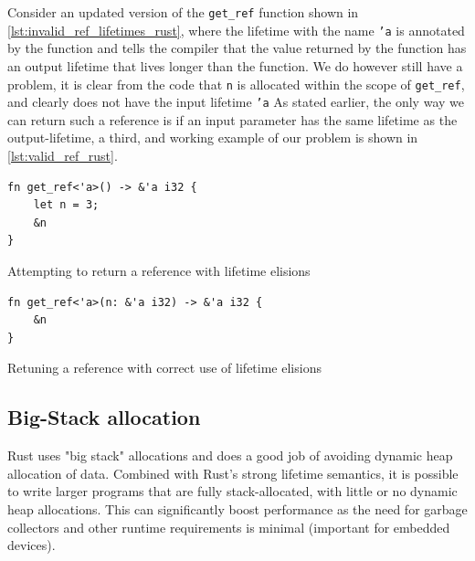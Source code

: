 Consider an updated version of the \texttt{get\_ref} function shown in \autoref{lst:invalid_ref_lifetimes_rust}, where the lifetime with the name \texttt{'a} is annotated by the function and tells the compiler that the value returned by the function has an output lifetime that lives longer than the function.
We do however still have a problem, it is clear from the code that \texttt{n} is allocated within the scope of \texttt{get\_ref}, and clearly does not have the input lifetime \texttt{'a}
As stated earlier, the only way we can return such a reference is if an input parameter has the same lifetime as the output-lifetime, a third, and working example of our problem is shown in \autoref{lst:valid_ref_rust}.


\begin{listing}[tb]
\begin{verbatim}
fn get_ref<'a>() -> &'a i32 {
    let n = 3;
    &n
}
\end{verbatim}
\caption{Attempting to return a reference with lifetime elisions}
\label{lst:invalid_ref_lifetimes_rust}
\end{listing}

\begin{listing}[tb]
\begin{verbatim}
fn get_ref<'a>(n: &'a i32) -> &'a i32 {
    &n
}
\end{verbatim}
\caption{Retuning a reference with correct use of lifetime elisions}
\label{lst:valid_ref_rust}
\end{listing}


\subsection{Big-Stack allocation}
\label{par:big_stack}

Rust uses "big stack" allocations and does a good job of avoiding dynamic heap allocation of data.
Combined with Rust's strong lifetime semantics, it is possible to write larger programs that are fully stack-allocated, with little or no dynamic heap allocations.
This can significantly boost performance as the need for garbage collectors and other runtime requirements is minimal (important for embedded devices).

